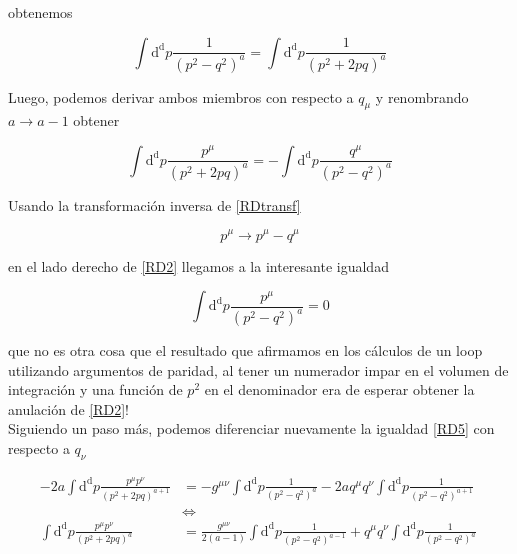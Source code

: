 \documentclass[tickz]{article}
\numberwithin{equation}{section}
\begin{document}
obtenemos

\begin{equation}
\int\mathrm{d^d}p \frac{1}{\left(p^2 - q^2 \right)^a}=\int\mathrm{d^d}p \frac{1}{\left(p^2 + 2pq \right)^a}
\end{equation}

Luego, podemos derivar ambos miembros con respecto a $ q_{\mu} $ y renombrando $ a \longrightarrow a - 1 $ obtener

\begin{equation}\label{RD5}
\int\mathrm{d^d}p \frac{p^{\mu}}{\left(p^2 + 2pq\right)^a} = -\int\mathrm{d^d}p \frac{q^{\mu}}{\left(p^2 - q^2 \right)^a}
\end{equation}

Usando la transformación inversa de \ref{RDtransf}

\begin{equation}\label{RDtransfinv}
p^{\mu} \longrightarrow p^{\mu} - q^{\mu} 
\end{equation}

en el lado derecho de \ref{RD2} llegamos a la interesante igualdad

\begin{equation}\label{paridad}
\int\mathrm{d^d}p \frac{p^{\mu}}{\left(p^2 - q^2\right)^a} =0
\end{equation}

que no es otra cosa que el resultado que afirmamos en los cálculos de un loop utilizando argumentos de paridad, al tener un numerador impar en el volumen de integración y una función de $ p^2 $ en el denominador era de esperar obtener la anulación de \ref{RD2}!\\

Siguiendo un paso más, podemos diferenciar nuevamente la igualdad \ref{RD5} con respecto a $ q_{\nu} $

\begin{equation}\label{RD6}
\begin{aligned}
-2a\int\mathrm{d^d}p \frac{p^{\mu}p^{\nu}}{\left(p^2 +2pq \right)^{a+1}}&=-g^{\mu\nu}\int\mathrm{d^d}p \frac{1}{\left(p^2 -q^2\right)^a} -2a q^{\mu}q^{\nu}\int\mathrm{d^d}p \frac{1}{\left(p^2 -q^2\right)^{a+1}} \ \ \\
& \iff\\
\int\mathrm{d^d}p \frac{p^{\mu}p^{\nu}}{\left(p^2 +2pq \right)^a}&= \frac{g^{\mu\nu}}{2(a-1)}\int\mathrm{d^d}p \frac{1}{\left(p^2 -q^2\right)^{a-1}} + q^{\mu}q^{\nu}\int\mathrm{d^d}p \frac{1}{\left(p^2 -q^2\right)^a}	
\end{aligned}
\end{equation}
\end{document}
